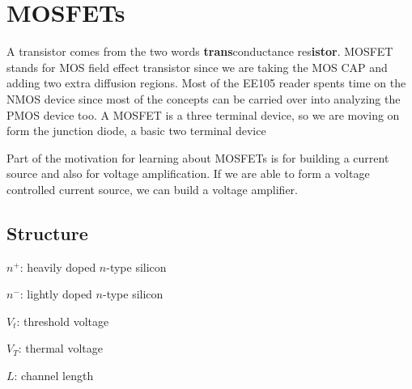 \chapter{MOSFETs}
A transistor comes from the two words \textbf{trans}conductance res\textbf{istor}. MOSFET stands for MOS field effect transistor since we are taking the MOS CAP and adding two extra diffusion regions. Most of the EE105 reader spents time on the NMOS device since most of the concepts can be carried over into analyzing the PMOS device too. A MOSFET is a three terminal device, so we are moving on form the junction diode, a basic two terminal device

Part of the motivation for learning about MOSFETs is for building a current source and also for voltage amplification. If we are able to form a voltage controlled current source, we can build a voltage amplifier.

\section{Structure}
\begin{gline}
    \item $n^+$: heavily doped $n$-type silicon
    \item $n^-$: lightly doped $n$-type silicon
    \item $V_t$: threshold voltage
    \item $V_T$: thermal voltage
    \item $L$: channel length
\end{gline}

